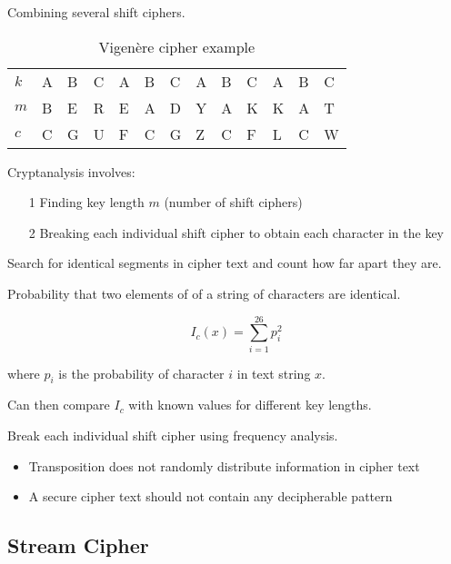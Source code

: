 \documentclass[a4paper]{article}
\begin{document}
Combining several shift ciphers.

\begin{table}[h]
  \centering
  \begin{tabular}{@{}lllllllllllll@{}}
    \toprule
    $k$ & A & B & C & A & B & C & A & B & C & A & B & C \\
    $m$ & B & E & R & E & A & D & Y & A & K & K & A & T \\
    \midrule
    $c$ & C & G & U & F & C & G & Z & C & F & L & C & W \\
    \bottomrule
  \end{tabular}
  \caption{Vigen\`ere cipher example}
  \label{tab:vigenere_cipher_example}
\end{table}
\FloatBarrier

Cryptanalysis involves:

\begin{enumerate}
  \item[1] Finding key length $m$ (number of shift ciphers)
  \item[2] Breaking each individual shift cipher to obtain each character in the
           key
\end{enumerate}


Search for identical segments in cipher text and count how far apart they are.


Probability that two elements of of a string of characters are identical.

\[
  I_{c}(x) = \sum^{26}_{i = 1}p^{2}_{i}
\]

where $p_{i}$ is the probability of character $i$ in text string $x$.

Can then compare $I_{c}$ with known values for different key lengths.


Break each individual shift cipher using frequency analysis.


\begin{itemize}
  \item Transposition does not randomly distribute information in cipher text
  \item A secure cipher text should not contain any decipherable pattern
\end{itemize}

\subsection{Stream Cipher}
\end{document}
